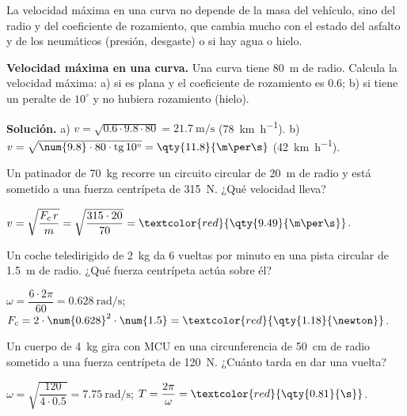 \begin{remark}
    La velocidad máxima en una curva no depende de la masa del vehículo, sino del radio y del coeficiente de rozamiento, que cambia
    mucho con el estado del asfalto y de los neumáticos (presión, desgaste) o si hay agua o hielo.
\end{remark}

\begin{example}
    \textbf{Velocidad máxima en una curva.} Una curva tiene \qty{80}{\m} de radio. Calcula la velocidad máxima: a) si es plana y el
    coeficiente de rozamiento es \num{0.6}; b) si tiene un peralte de \(10^\circ\) y no hubiera rozamiento (hielo).

    \textbf{Solución.} a) \(v = \sqrt{\num{0.6} \cdot \num{9.8} \cdot 80} = \qty{21.7}{\m\per\s}\) (\qty{78}{\km\per\hour}).
    b) \(v = \sqrt{\num{9.8} \cdot 80 \cdot \tg 10^\circ} = \qty{11.8}{\m\per\s}\) (\qty{42}{\km\per\hour}).
\end{example}

\begin{exercise}
    Un patinador de \qty{70}{\kg} recorre un circuito circular de \qty{20}{\m} de radio y está sometido a una fuerza centrípeta de
    \qty{315}{\newton}. ¿Qué velocidad lleva?
    \begin{solu}
        \(v = \sqrt{\dfrac{F_c\,r}{m}} = \sqrt{\dfrac{315 \cdot 20}{70}} = \textcolor{red}{\qty{9.49}{\m\per\s}}\).
    \end{solu}
\end{exercise}

\begin{exercise}
    Un coche teledirigido de \qty{2}{\kg} da 6 vueltas por minuto en una pista circular de \qty{1.5}{\m} de radio. ¿Qué fuerza
    centrípeta actúa sobre él?
    \begin{solu}
        \(\omega = \dfrac{6 \cdot 2\pi}{60} = \qty{0.628}{\radian\per\s}\); \(F_c = 2 \cdot \num{0.628}^2 \cdot \num{1.5} = \textcolor{red}{\qty{1.18}{\newton}}\).
    \end{solu}
\end{exercise}

\begin{exercise}
    Un cuerpo de \qty{4}{\kg} gira con MCU en una circunferencia de \qty{50}{\cm} de radio sometido a una fuerza centrípeta de
    \qty{120}{\newton}. ¿Cuánto tarda en dar una vuelta?
    \begin{solu}
        \(\omega = \sqrt{\dfrac{120}{4 \cdot \num{0.5}}} = \qty{7.75}{\radian\per\s}\); \(T = \dfrac{2\pi}{\omega} = \textcolor{red}{\qty{0.81}{\s}}\).
    \end{solu}
\end{exercise}

